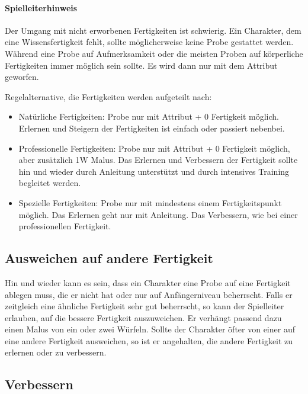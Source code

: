 \documentclass{article}
\begin{document}
\begin{mdframed}[hidealllines=true, backgroundcolor=black!10]
\paragraph{Spielleiterhinweis}

Der Umgang mit nicht erworbenen Fertigkeiten ist schwierig. Ein Charakter, dem eine Wissensfertigkeit fehlt, sollte
möglicherweise keine Probe gestattet werden. Während eine Probe auf Aufmerksamkeit oder die meisten Proben auf
körperliche Fertigkeiten immer möglich sein sollte. Es wird dann nur mit dem Attribut geworfen.

Regelalternative, die Fertigkeiten werden aufgeteilt nach:
\begin{itemize}
\item Natürliche Fertigkeiten: Probe nur mit Attribut + 0 Fertigkeit möglich. Erlernen und Steigern der Fertigkeiten ist einfach oder passiert nebenbei.
\item Professionelle Fertigkeiten: Probe nur mit Attribut + 0 Fertigkeit möglich, aber zusätzlich 1W Malus. Das Erlernen und Verbessern der Fertigkeit sollte hin und wieder durch Anleitung unterstützt und durch intensives Training begleitet werden.
\item Spezielle Fertigkeiten: Probe nur mit mindestens einem Fertigkeitspunkt möglich. Das Erlernen geht nur mit Anleitung. Das Verbessern, wie bei einer professionellen Fertigkeit.
\end{itemize}

\end{mdframed}
\begin{center}
\subsection{Ausweichen auf andere Fertigkeit}
\end{center}

Hin und wieder kann es sein, dass ein Charakter eine Probe auf eine Fertigkeit ablegen muss, die er nicht hat oder nur
auf Anfängerniveau beherrscht. Falls er zeitgleich eine ähnliche Fertigkeit sehr gut beherrscht, so kann der
Spielleiter erlauben, auf die bessere Fertigkeit auszuweichen. Er verhängt passend dazu einen Malus von ein oder zwei
Würfeln. Sollte der Charakter öfter von einer auf eine andere Fertigkeit ausweichen, so ist er angehalten, die andere
Fertigkeit zu erlernen oder zu verbessern.

\begin{center}
\subsection{Verbessern}
\end{center}
\end{document}
